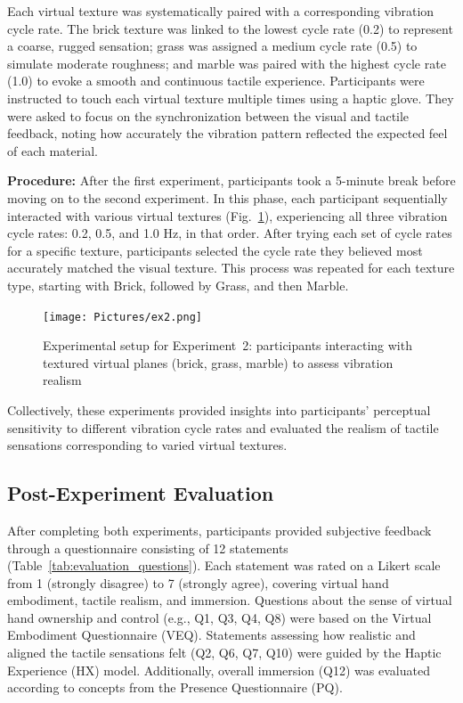 Each virtual texture was systematically paired with a corresponding vibration cycle rate. The brick texture was linked to the lowest cycle rate (0.2) to represent a coarse, rugged sensation; grass was assigned a medium cycle rate (0.5) to simulate moderate roughness; and marble was paired with the highest cycle rate (1.0) to evoke a smooth and continuous tactile experience. Participants were instructed to touch each virtual texture multiple times using a haptic glove. They were asked to focus on the synchronization between the visual and tactile feedback, noting how accurately the vibration pattern reflected the expected feel of each material.

\textbf{Procedure:} After the first experiment, participants took a 5-minute break before moving on to the second experiment. In this phase, each participant sequentially interacted with various virtual textures (Fig.~\ref{fig:experiment2_setup}), experiencing all three vibration cycle rates: 0.2, 0.5, and 1.0 Hz, in that order. After trying each set of cycle rates for a specific texture, participants selected the cycle rate they believed most accurately matched the visual texture. This process was repeated for each texture type, starting with Brick, followed by Grass, and then Marble.

\begin{figure}[H]\centering
	\texttt{[image: Pictures/ex2.png]}%
	\caption{Experimental setup for Experiment~2: participants interacting with textured virtual planes (brick, grass, marble) to assess vibration realism}\label{fig:experiment2_setup}
\end{figure}

Collectively, these experiments provided insights into participants' perceptual sensitivity to different vibration cycle rates and evaluated the realism of tactile sensations corresponding to varied virtual textures.

\newpage
\subsection{Post-Experiment Evaluation}
After completing both experiments, participants provided subjective feedback through a questionnaire consisting of 12 statements (Table~\ref{tab:evaluation_questions}). Each statement was rated on a Likert scale from 1 (strongly disagree) to 7 (strongly agree), covering virtual hand embodiment, tactile realism, and immersion. Questions about the sense of virtual hand ownership and control (e.g., Q1, Q3, Q4, Q8) were based on the Virtual Embodiment Questionnaire (VEQ)\cite{10.1145/3027063.3053272}. Statements assessing how realistic and aligned the tactile sensations felt (Q2, Q6, Q7, Q10) were guided by the Haptic Experience (HX) model\cite{10.1016/j.ijhcs.2017.04.004}. Additionally, overall immersion (Q12) was evaluated according to concepts from the Presence Questionnaire (PQ)\cite{10.1162/105474698565686}.


